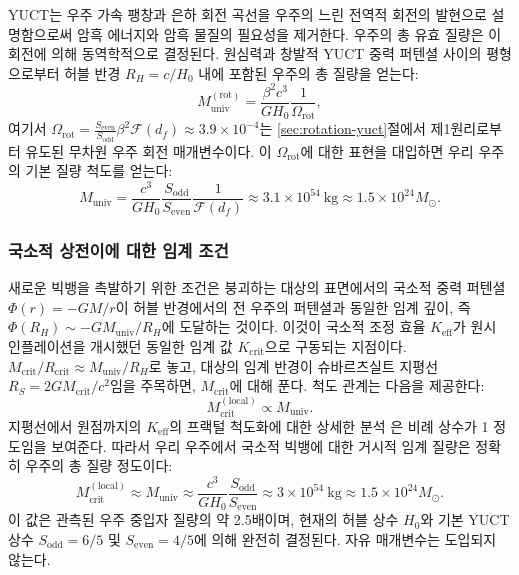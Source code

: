 \documentclass[11pt,a4paper]{article}
\begin{document}
	YUCT는 우주 가속 팽창과 은하 회전 곡선을 우주의 느린 전역적 회전의 발현으로 설명함으로써 암흑 에너지와 암흑 물질의 필요성을 제거한다. 우주의 총 유효 질량은 이 회전에 의해 동역학적으로 결정된다. 원심력과 창발적 YUCT 중력 퍼텐셜 사이의 평형으로부터 허블 반경 \(R_H = c/H_0\) 내에 포함된 우주의 총 질량을 얻는다:
	\begin{equation}
		M_{\mathrm{univ}}^{\mathrm{(rot)}} = \frac{\beta^2 c^3}{G H_0} \frac{1}{\Omega_{\mathrm{rot}}},
	\end{equation}
	여기서 \(\Omega_{\mathrm{rot}} = \frac{S_{\mathrm{even}}}{S_{\mathrm{odd}}} \beta^2 \mathcal{F}(d_f) \approx 3.9 \times 10^{-4}\)는 \ref{sec:rotation-yuct}절에서 제1원리로부터 유도된 무차원 우주 회전 매개변수이다. 이 \(\Omega_{\mathrm{rot}}\)에 대한 표현을 대입하면 우리 우주의 기본 질량 척도를 얻는다:
	\begin{equation}
		M_{\mathrm{univ}} = \frac{c^3}{G H_0} \frac{S_{\mathrm{odd}}}{S_{\mathrm{even}}} \frac{1}{\mathcal{F}(d_f)} \approx 3.1 \times 10^{54}\ \mathrm{kg} \approx 1.5 \times 10^{24} M_{\odot}.
	\end{equation}
	
	\subsubsection{국소적 상전이에 대한 임계 조건}
	
	새로운 빅뱅을 촉발하기 위한 조건은 붕괴하는 대상의 표면에서의 국소적 중력 퍼텐셜 \(\Phi(r) = -GM/r\)이 허블 반경에서의 전 우주의 퍼텐셜과 동일한 임계 깊이, 즉 \(\Phi(R_H) \sim -G M_{\mathrm{univ}}/R_H\)에 도달하는 것이다. 이것이 국소적 조정 효율 \(K_{\mathrm{eff}}\)가 원시 인플레이션을 개시했던 동일한 임계 값 \(K_{\mathrm{crit}}\)으로 구동되는 지점이다. \(M_{\mathrm{crit}}/R_{\mathrm{crit}} \approx M_{\mathrm{univ}}/R_H\)로 놓고, 대상의 임계 반경이 슈바르츠실트 지평선 \(R_S = 2GM_{\mathrm{crit}}/c^2\)임을 주목하면, \(M_{\mathrm{crit}}\)에 대해 푼다. 척도 관계는 다음을 제공한다:
	\begin{equation}
		M_{\mathrm{crit}}^{\mathrm{(local)}} \propto M_{\mathrm{univ}}.
	\end{equation}
	지평선에서 원점까지의 \(K_{\mathrm{eff}}\)의 프랙털 척도화에 대한 상세한 분석 \cite{AppendixL}은 비례 상수가 1 정도임을 보여준다. 따라서 우리 우주에서 국소적 빅뱅에 대한 거시적 임계 질량은 정확히 우주의 총 질량 정도이다:
	\begin{equation}
		\boxed{ M_{\mathrm{crit}}^{\mathrm{(local)}} \approx M_{\mathrm{univ}} \approx \frac{c^3}{G H_0} \frac{S_{\mathrm{odd}}}{S_{\mathrm{even}}} \approx 3 \times 10^{54}\ \mathrm{kg} \approx 1.5 \times 10^{24} M_{\odot} }.
		\label{eq:Mcrit-macro}
	\end{equation}
	이 값은 관측된 우주 중입자 질량의 약 2.5배이며, 현재의 허블 상수 \(H_0\)와 기본 YUCT 상수 \(S_{\mathrm{odd}}=6/5\) 및 \(S_{\mathrm{even}}=4/5\)에 의해 완전히 결정된다. 자유 매개변수는 도입되지 않는다.
	
\end{document}
